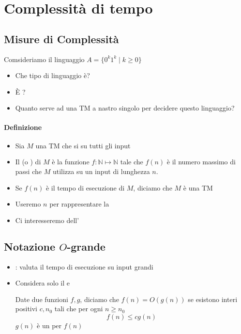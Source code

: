 \section{Complessità di tempo}
\subsection{Misure di Complessità}
Comsideriamo il linguaggio $A=\{0^k1^k\mid k \geq 0\}$
\begin{itemize}
  \item Che tipo di linguaggio è?
  \item È ?
  \item Quanto  serve ad una TM a nastro singolo per decidere questo 
    linguaggio?
\end{itemize}
\paragraph{Definizione}
\begin{itemize}
  \item Sia $M$ una TM  che si  su tutti gli input
  \item Il  (o ) di $M$ è
    la funzione $f:\mathbb{N} \mapsto\mathbb{N}$ tale che $f(n)$ è 
    il numero massimo di passi che $M$ utilizza su un input di lunghezza $n$.
  \item Se $f(n)$ è il tempo di esecuzione di $M$, diciamo che $M$ è una TM
  \item Useremo $n$ per rappresentare la 
  \item Ci interesseremo dell'
\end{itemize}
\subsection{Notazione $O$-grande}
\begin{itemize}
  \item {}: valuta il tempo di esecuzione su input grandi 
  \item Considera solo il  e 
    \begin{definition}
      Date due funzioni $f,g$, diciamo che $f(n) = O(g(n))$ se esistono interi positivi
      $c, n_0$ tali che per ogni $n\geq n_0$
      \begin{displaymath}
        f(n)\leq c g(n)
      \end{displaymath}
      $g(n)$ è un  per $f(n)$ 
    \end{definition}
\end{itemize}

